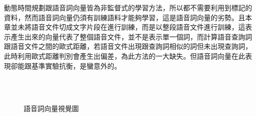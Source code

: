 動態時間規劃跟語音詞向量皆為非監督式的學習方法，所以都不需要利用到標記的資料，然而語音詞向量仍須有訓練語料才能夠學習，這是語音詞向量的劣勢。且本章並未將語音文件切成文字片段在進行訓練，而是以整段語音文件進行訓練，這表示產生出來的向量代表了整個語音文件，並不是表示單一個詞，而計算語音查詢詞跟語音文件之間的歐式距離，若語音文件出現跟查詢詞相似的詞但未出現查詢詞，此時利用歐式距離判別會產生出偏差，為此方法的一大缺失。但語音詞向量在此表現卻能跟基準實驗抗衡，是蠻意外的。
\begin{figure}[h]
\centering
{}
\\
\\
\caption{語音詞向量視覺圖}
\label{fig:ch5_vis}
\end{figure}

